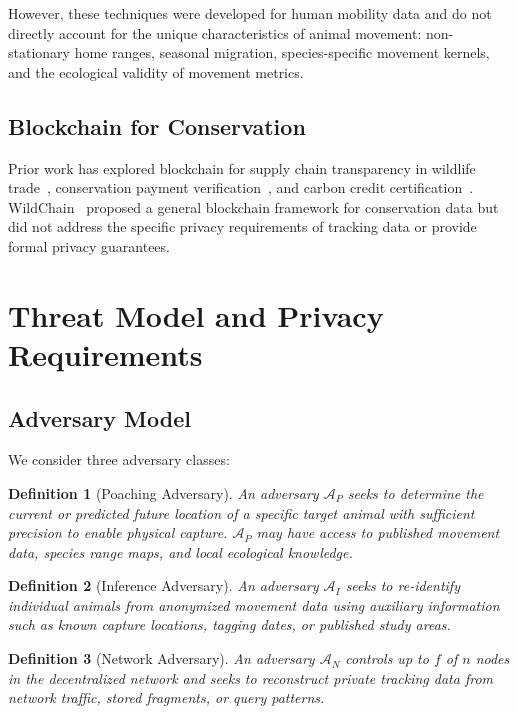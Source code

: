\documentclass[11pt,letterpaper]{article}
\newtheorem{definition}{Definition}[section]
\begin{document}
However, these techniques were developed for human mobility data and do not directly account for the unique characteristics of animal movement: non-stationary home ranges, seasonal migration, species-specific movement kernels, and the ecological validity of movement metrics.

\subsection{Blockchain for Conservation}

Prior work has explored blockchain for supply chain transparency in wildlife trade~\cite{maxwell2021}, conservation payment verification~\cite{kshetri2021}, and carbon credit certification~\cite{howson2019}. WildChain~\cite{wildchain2023} proposed a general blockchain framework for conservation data but did not address the specific privacy requirements of tracking data or provide formal privacy guarantees.

\section{Threat Model and Privacy Requirements}

\subsection{Adversary Model}

We consider three adversary classes:

\begin{definition}[Poaching Adversary]
An adversary $\mathcal{A}_P$ seeks to determine the current or predicted future location of a specific target animal with sufficient precision to enable physical capture. $\mathcal{A}_P$ may have access to published movement data, species range maps, and local ecological knowledge.
\end{definition}

\begin{definition}[Inference Adversary]
An adversary $\mathcal{A}_I$ seeks to re-identify individual animals from anonymized movement data using auxiliary information such as known capture locations, tagging dates, or published study areas.
\end{definition}

\begin{definition}[Network Adversary]
An adversary $\mathcal{A}_N$ controls up to $f$ of $n$ nodes in the decentralized network and seeks to reconstruct private tracking data from network traffic, stored fragments, or query patterns.
\end{definition}
\end{document}
